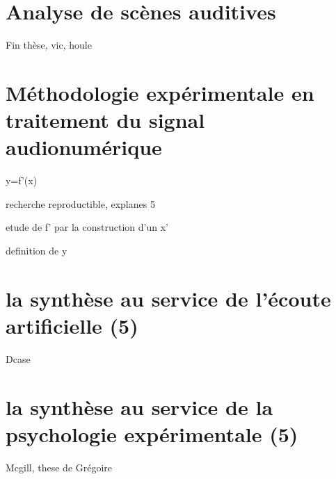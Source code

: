 \section{Analyse de scènes auditives}

Fin thèse, vic, houle

\section{Méthodologie expérimentale en traitement du signal audionumérique}

y=f'(x)

recherche reproductible, explanes 5

etude de f' par la construction d'un x'

definition de y

\section{la synthèse au service de l'écoute artificielle (5)}

Dcase

\section{la synthèse au service de la psychologie expérimentale (5)}

Mcgill, these de Grégoire
